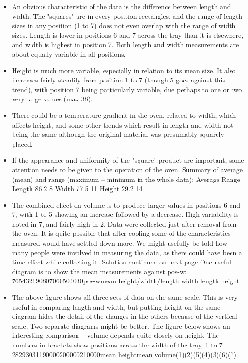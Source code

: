 \documentclass[a4paper,12pt]{article}
\begin{document}
\begin{itemize}
    \item An obvious characteristic of the data is the difference between length and width. The "squares" are in every position rectangles, and the range of length sizes in any position (1 to 7) does not even overlap with the range of width sizes. Length is lower in positions 6 and 7 across the tray than it is elsewhere, and width is highest in position 7. Both length and width measurements are about equally variable in all positions.
\item 
Height is much more variable, especially in relation to its mean size. It also increases fairly steadily from position 1 to 7 (though 5 goes against this trend), with position 7 being particularly variable, due perhaps to one or two very large values (max 38).
\item There could be a temperature gradient in the oven, related to width, which affects height, and some other trends which result in length and width not being the same although the original material was presumably squarely placed.
\item If the appearance and uniformity of the "square" product are important, some attention needs to be given to the operation of the oven.
Summary of average (mean) and range (maximum – minimum in the whole data):
Average Range
Length 86.2 8
Width 77.5 11
Height 29.2 14
\item The combined effect on volume is to produce larger values in positions 6 and 7, with 1 to 5 showing an increase followed by a decrease. High variability is noted in 7, and fairly high in 2.
Data were collected just after removal from the oven. It is quite possible that after cooling some of the characteristics measured would have settled down more. We might usefully be told how many people were involved in measuring the data, as there could have been a time effect while collecting it.
Solution continued on next page
One useful diagram is to show the mean measurements against pos-w: 765432190807060504030pos-wmean height/width/length
width
length
height
\item The above figure shows all three sets of data on the same scale. This is very useful in comparing length and width, but putting height on the same diagram hides the detail of the changes in the others because of the vertical scale. Two separate diagrams might be better.
The figure below shows an interesting comparison – volume depends quite closely on height. The numbers in brackets show positions across the width of the tray, 1 to 7. 28293031190000200000210000mean heightmean volume(1)(2)(5)(4)(3)(6)(7)\end{itemize}
\end{document}
